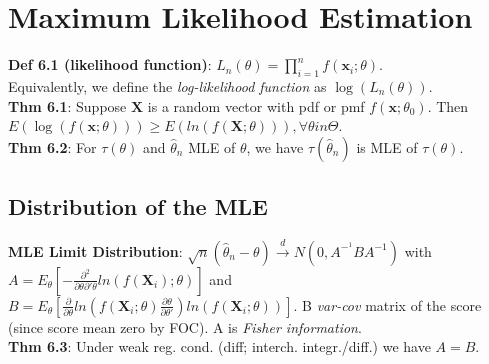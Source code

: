 \section{Maximum Likelihood Estimation}
\textbf{Def 6.1 (likelihood function)}: $L_n(\theta) = \prod_{i=1}^nf(\textbf{x}_i;\theta)$.\\
Equivalently, we define the \textit{log-likelihood function} as $\log(L_n(\theta))$.\\
\textbf{Thm 6.1}: Suppose $\textbf{X}$ is a random vector with pdf or pmf $f(\textbf{x};\theta_0)$. Then $E(\log(f(\textbf{x};\theta)))\geq E(ln(f(\textbf{X};\theta))), \forall \theta in \Theta$.\\
\textbf{Thm 6.2}: For $\tau(\theta)$ and $\hat{\theta}_n$ MLE of $\theta$, we have $\tau(\hat{\theta}_n)$ is MLE of $\tau(\theta)$.

\subsection{Distribution of the MLE}
\textbf{MLE Limit Distribution}: $\sqrt{n}(\hat{\theta}_n - \theta) \xrightarrow{d} N(0, A^{-^1}BA^{-1})$ with $A = E_\theta[-\frac{\partial^2}{\partial\theta\partial'\theta}ln(f(\textbf{X}_i);\theta)]$ and $B = E_\theta[\frac{\partial}{\partial\theta}ln(f(\textbf{X}_i;\theta)\frac{\partial\theta}{\partial\theta'})ln(f(\textbf{X}_i;\theta))]$. B \textit{var-cov} matrix of the score (since score mean zero by FOC). A is \textit{Fisher information}.\\
\textbf{Thm 6.3}: Under weak reg. cond. (diff; interch. integr./diff.) we have $A=B$.

